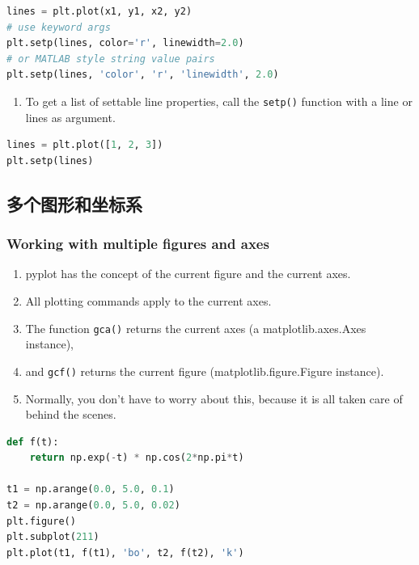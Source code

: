 \documentclass[UTF8,a4paper,12pt]{ctexart}  %
\providecommand{\tightlist}{\setlength{\itemsep}{0pt}\setlength{\parskip}{0pt}}
\newcommand{\passthrough}[1]{\lstset{mathescape=false}#1\lstset{mathescape=true}}
\begin{document}
\begin{lstlisting}[language=Python]
lines = plt.plot(x1, y1, x2, y2)
# use keyword args
plt.setp(lines, color='r', linewidth=2.0)
# or MATLAB style string value pairs
plt.setp(lines, 'color', 'r', 'linewidth', 2.0)
\end{lstlisting}

\begin{enumerate}
\def\labelenumi{\arabic{enumi}.}
\tightlist
\item
  To get a list of settable line properties, call the \passthrough{\lstinline!setp()!}
  function with a line or lines as argument.
\end{enumerate}

\begin{lstlisting}[language=Python]
lines = plt.plot([1, 2, 3])
plt.setp(lines)
\end{lstlisting}

\hypertarget{ux591aux4e2aux56feux5f62ux548cux5750ux6807ux7cfb}{%
\subsection{多个图形和坐标系}\label{ux591aux4e2aux56feux5f62ux548cux5750ux6807ux7cfb}}

\hypertarget{working-with-multiple-figures-and-axes}{%
\subsubsection{Working with multiple figures and axes}\label{working-with-multiple-figures-and-axes}}

\begin{enumerate}
\def\labelenumi{\arabic{enumi}.}
\tightlist
\item
  pyplot has the concept of the current figure and the current axes.
\item
  All plotting commands apply to the current axes.
\item
  The function \passthrough{\lstinline!gca()!} returns the current axes (a
  matplotlib.axes.Axes instance),
\item
  and \passthrough{\lstinline!gcf()!} returns the current figure (matplotlib.figure.Figure
  instance).
\item
  Normally, you don't have to worry about this, because it is all
  taken care of behind the scenes.
\end{enumerate}

\begin{lstlisting}[language=Python]
def f(t):
    return np.exp(-t) * np.cos(2*np.pi*t)

t1 = np.arange(0.0, 5.0, 0.1)
t2 = np.arange(0.0, 5.0, 0.02)
plt.figure()
plt.subplot(211)
plt.plot(t1, f(t1), 'bo', t2, f(t2), 'k')
\end{lstlisting}
\end{document}
